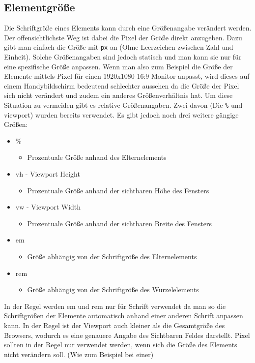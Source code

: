 \documentclass{article}
\begin{document}
		\subsection{Elementgröße}
		Die Schriftgröße eines Elements kann durch eine Größenangabe verändert werden. Der offensichtlichste Weg ist dabei die Pixel der Größe direkt anzugeben. Dazu gibt man einfach die Größe mit \texttt{px} an (Ohne Leerzeichen zwischen Zahl und Einheit). Solche Größenangaben sind jedoch statisch und man kann sie nur für eine spezifische Größe anpassen. Wenn man also zum Beispiel die Größe der Elemente mittels Pixel für einen 1920x1080 16:9 Monitor anpasst, wird dieses auf einem Handybildschirm bedeutend schlechter aussehen da die Größe der Pixel sich nicht verändert und zudem ein anderes Größenverhältnis hat. Um diese Situation zu vermeiden gibt es relative Größenangaben. Zwei davon (Die \texttt{\%} und viewport) wurden bereits verwendet. Es gibt jedoch noch drei weitere gängige Größen:
		\begin{itemize}
			\item{\%}
			\begin{itemize}
				\item{Prozentuale Größe anhand des Elternelements}
			\end{itemize}
			\item{vh - Viewport Height}
			\begin{itemize}
				\item{Prozentuale Größe anhand der sichtbaren Höhe des Fensters}
			\end{itemize}
			\item{vw - Viewport Width}
			\begin{itemize}
				\item{Prozentuale Größe anhand der sichtbaren Breite des Fensters}
			\end{itemize}
			\item{em}
			\begin{itemize}
				\item{Größe abhängig von der Schriftgröße des Elternelements}
			\end{itemize}
			\item{rem}
			\begin{itemize}
				\item{Größe abhängig von der Schriftgröße des Wurzelelements}
			\end{itemize}
	\end{itemize}
	In der Regel werden em und rem nur für Schrift verwendet da man so die Schriftgrößen der Elemente automatisch anhand einer anderen Schrift anpassen kann. In der Regel ist der Viewport auch kleiner als die Gesamtgröße des Browsers, wodurch es eine genauere Angabe des Sichtbaren Feldes darstellt. Pixel sollten in der Regel nur verwendet werden, wenn sich die Größe des Elements nicht verändern soll. (Wie zum Beispiel bei einer)
\end{document}
